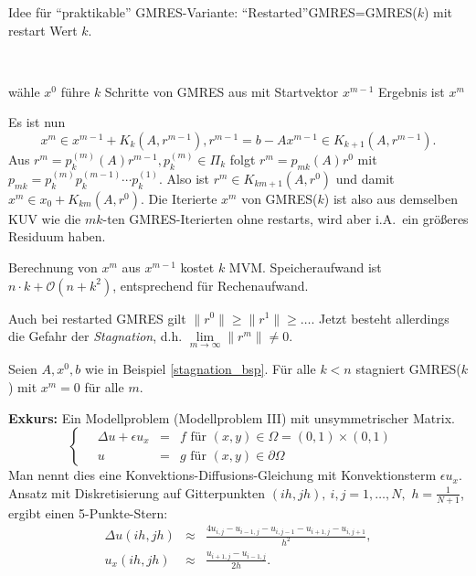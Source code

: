 Idee f\"ur "`praktikable"' GMRES-Variante: "`Restarted"'GMRES=GMRES($k$)
mit restart Wert $k$.
\begin{alg}[GMRES($k$)]
~               %
\vspace*{-2\baselineskip}       %
\begin{algorithm}
  \begin{algorithmic}
    \STATE w\"ahle $x^0$
      \STATE f\"uhre $k$ Schritte von GMRES aus mit Startvektor $x^{m-1}$
      \STATE Ergebnis ist $x^m$
    \ENDFOR
  \end{algorithmic}
\end{algorithm}
\end{alg}
Es ist nun $$ x^m \in x^{m-1}+K_k(A,r^{m-1}), r^{m-1}=b-Ax^{m-1} \in K_{k+1}(A,r^{m-1}).$$
Aus $r^{m} = p_k^{(m)}(A)r^{m-1}, p_k^{(m)} \in \Pi_k$ folgt $r^{m} = p_{mk}(A)r^0$ mit
$p_{mk} = p^{(m)}_kp_k^{(m-1)} \cdots p^{(1)}_k$. Also ist $r^m \in K_{km+1}(A,r^0)$ und
damit $x^m \in x_0 +K_{km}(A,r^0)$. Die Iterierte $x^m$ von GMRES($k$) ist also aus demselben
KUV wie die $mk$-ten GMRES-Iterierten ohne restarts, wird aber i.A.\ ein gr\"o\ss{}eres Residuum haben.


\begin{bem}
Berechnung von $x^m$ aus $x^{m-1}$ kostet $k$ MVM. Speicheraufwand
ist $n\cdot k+\mathcal{O}(n+k^2)$, entsprechend f\"ur Rechenaufwand.
\end{bem}

Auch bei restarted GMRES gilt  $\|r^0\| \geq \|r^1\|\geq \ldots $.
Jetzt besteht allerdings die Gefahr der \emph{Stagnation}, d.h. 
$\lim\limits_{m\rightarrow\infty} \|r^m\|\not=0.$
\begin{bsp}
Seien $A,x^0,b$ wie in Beispiel \ref{stagnation_bsp}.
F\"ur alle $k<n$ stagniert GMRES($k$) mit $x^m=0$ f\"ur alle $m$.
\end{bsp}

{\bf Exkurs:} Ein Modellproblem (Modellproblem III) mit
unsymmetrischer Matrix.
\begin{equation} \label{conv_diff_eq}
\left\{ \quad
\begin{array}{rcl}
\Delta u + \epsilon u_x &=& f  \text{ f\"ur } (x,y)\in\Omega=(0,1)\times(0,1)\\
u &=& g   \text{ f\"ur } (x,y)\in \partial \Omega 
\end{array}
\quad
\right.
\end{equation}
Man nennt dies eine Konvektions-Diffusions-Gleichung mit Konvektionsterm
$\epsilon u_x$.
Ansatz mit Diskretisierung auf Gitterpunkten $(ih,jh),\ i,j=1,\ldots,N,$ $h=\frac{1}{N+1}$,
ergibt einen 5-Punkte-Stern:
\begin{eqnarray*}
\Delta u(ih,jh) & \approx & \frac{4u_{i,j}-u_{i-1,j}-u_{i,j-1}-u_{i+1,j}-u_{i,j+1}}{h^2}, \\
 u_x(ih,jh) & \approx & \frac{u_{i+1,j}-u_{i-1,j}}{2h}.
\end{eqnarray*}

